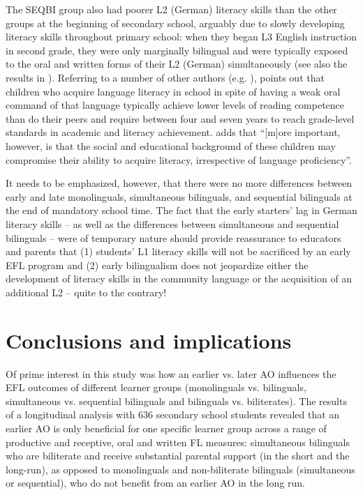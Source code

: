 \documentclass[output=paper,modfonts,nonflat,newtxmath]{langsci/langscibook}
\begin{document}
The SEQBI group also had poorer L2 (German) literacy skills than the other groups at the beginning of secondary school, arguably due to slowly developing literacy skills throughout primary school: when they began L3 English instruction in second grade, they were only marginally bilingual and were typically exposed to the oral and written forms of their L2 (German) simultaneously (see also the results in \citealt{SánchezBardel2017}). Referring to a number of other authors (e.g. \citealt{AugustHakuta1997, Collier1987, Cummins1991}), \citet{Bialystok2007} points out that children who acquire language literacy in school in spite of having a weak oral command of that language typically achieve lower levels of reading competence than do their peers and require between four and seven years to reach grade-level standards in academic and literacy achievement. \citet[22]{Bialystok2007} adds that “[m]ore important, however, is that the social and educational background of these children may compromise their ability to acquire literacy, irrespective of language proficiency”.

It needs to be emphasized, however, that there were no more differences between early and late monolinguals, simultaneous bilinguals, and sequential bilinguals at the end of mandatory school time. The fact that the early starters’ lag in German literacy skills – as well as the differences between simultaneous and sequential bilinguals – were of temporary nature should provide reassurance to educators and parents that (1) students’ L1 literacy skills will not be sacrificed by an early EFL program and (2) early bilingualism does not jeopardize either the development of literacy skills in the community language or the acquisition of an additional L2 – quite to the contrary!\\

\section{Conclusions and implications}
\label{sec:pfenninger:6}

Of prime interest in this study was how an earlier vs. later AO influences the EFL outcomes of different learner groups (monolinguals vs. bilinguals, simultaneous vs. sequential bilinguals and bilinguals vs. biliterates). The results of a longitudinal analysis with 636 secondary school students revealed that an earlier AO is only beneficial for one specific learner group across a range of productive and receptive, oral and written FL measures: simultaneous bilinguals who are biliterate and receive substantial parental support (in the short and the long-run), as opposed to monolinguals and non-biliterate bilinguals (simultaneous or sequential), who do not benefit from an earlier AO in the long run.
\end{document}
